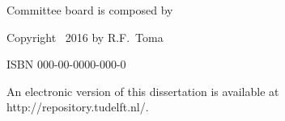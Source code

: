 \documentclass[12pt,a4paper]{report}
\begin{document}
\begin{titlepage}
\begin{center}
		\end{center}
		\vfill
		\noindent Committee board is composed by
		
		
			
			\medskip
		
		
		\vspace{4\bigskipamount}
		
		\noindent Copyright \textcopyright\ 2016 by R.F.~Toma
		
		
		\medskip
		\noindent ISBN 000-00-0000-000-0
		
		\medskip
		\noindent An electronic version of this dissertation is available at \\
		{http://repository.tudelft.nl/}.
		
	\end{titlepage}
\end{document}
